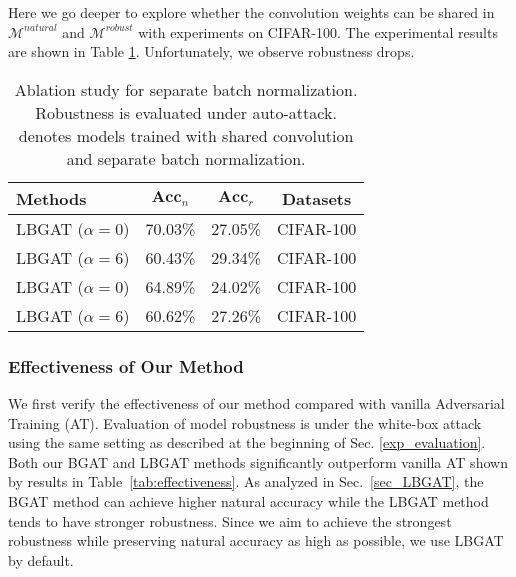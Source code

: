 \documentclass[10pt,twocolumn,letterpaper]{article}
\begin{document}
Here we go deeper to explore whether the convolution weights can be shared in $\mathcal{M}^{natural}$ and $\mathcal{M}^{robust}$ with experiments on CIFAR-100. The experimental results are shown in Table \ref{tab:ablation_separate_bn}. Unfortunately, we observe robustness drops. 

\begin{table}
	\centering
	\caption{Ablation study for separate batch normalization. Robustness is evaluated under auto-attack. \dag denotes models trained with shared convolution and separate batch normalization.} 
	\resizebox{0.90\linewidth}{!}
	{
		\begin{tabular}{l|c|c|c}
			\textbf{Methods} &$\textbf{Acc}_{n}$ &$\textbf{Acc}_{r}$ &\textbf{Datasets}\\
			\hline
			\hline
			LBGAT ($\alpha=0$)        &70.03\%  &27.05\% &CIFAR-100 \\
			LBGAT ($\alpha=6$)        &60.43\%  &29.34\% &CIFAR-100 \\
			\hline
			LBGAT ($\alpha=0$) \dag        &64.89\%  &24.02\% &CIFAR-100 \\
			LBGAT ($\alpha=6$) \dag        &60.62\%  &27.26\% &CIFAR-100 \\
			\hline
		\end{tabular}
		\label{tab:ablation_separate_bn}
	}
\end{table}

\subsubsection{Effectiveness of Our Method}
\label{exp_effectiveness}
We first verify the effectiveness of our method compared with vanilla Adversarial Training (AT). Evaluation of model robustness is under the white-box attack using the same setting as described at the beginning of Sec. \ref{exp_evaluation}. Both our BGAT and LBGAT methods significantly outperform vanilla AT shown by results in Table~\ref{tab:effectiveness}. As analyzed in Sec.~\ref{sec_LBGAT}, the BGAT method can achieve higher natural accuracy while the LBGAT method tends to have stronger robustness. Since we aim to achieve the strongest robustness while preserving natural accuracy as high as possible, we use LBGAT by default.   
\end{document}
